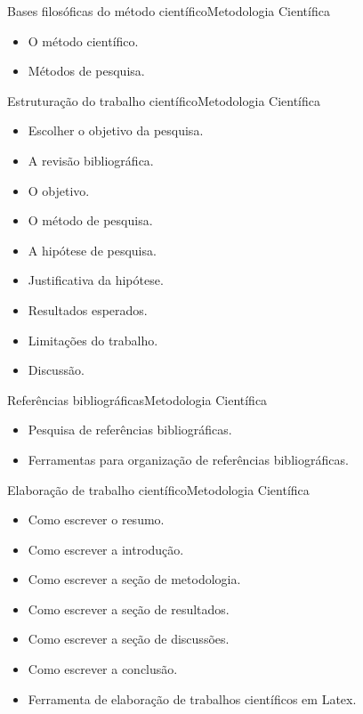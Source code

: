 \documentclass[t]{beamer}
\begin{document}

\begin{ftst}{Bases filosóficas do método científico}{Metodologia Científica}
\vone
\vone
\begin{itemize}
    \item O método científico.
    \item Métodos de pesquisa.
\end{itemize}

\end{ftst}


\begin{ftst}{Estruturação do trabalho científico}{Metodologia Científica}
\vone
\vone
\begin{itemize}
        \item Escolher o objetivo da pesquisa.
        \item A revisão bibliográfica.
        \item O objetivo.
        \item O método de pesquisa.
        \item A hipótese de pesquisa.
        \item Justificativa da hipótese.
        \item Resultados esperados.
        \item Limitações do trabalho.
        \item Discussão.
\end{itemize}

\end{ftst}


\begin{ftst}{Referências bibliográficas}{Metodologia Científica}
\vone
\vone
\begin{itemize}
    \item Pesquisa de referências bibliográficas.
    \item Ferramentas para organização de referências bibliográficas.
\end{itemize}
\end{ftst}


\begin{ftst}{Elaboração de trabalho científico}{Metodologia Científica}
\vone
\vone
\begin{itemize}
    \item Como escrever o resumo.
    \item Como escrever a introdução.
    \item Como escrever a seção de metodologia.
    \item Como escrever a seção de resultados.
    \item Como escrever a seção de discussões.
    \item Como escrever a conclusão.
    \item Ferramenta de elaboração de trabalhos científicos em Latex.
\end{itemize}


\end{ftst}
\end{document}

